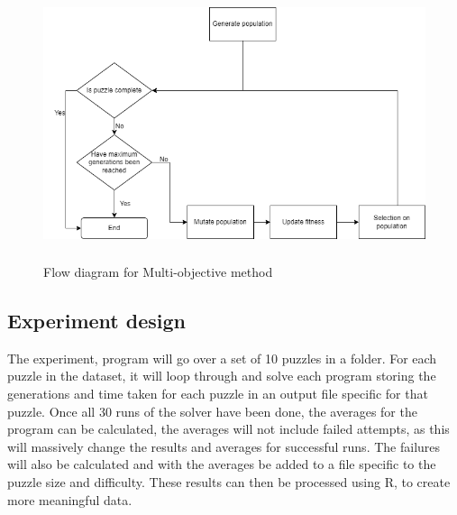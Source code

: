 \documentclass[a4paper,11pt]{article}
\begin{document}
\begin{figure}[h]
	\caption{Flow diagram for Multi-objective method}
	\centering
	\includegraphics[height=8cm,width=15cm]{./Diagrams/multiobjectiveFlowchart}
\end{figure}

\subsection{Experiment design}

The experiment, program will go over a set of 10 puzzles in a folder. For each puzzle in the dataset, it will loop through and solve each program storing the generations and time taken for each puzzle in an output file specific for that puzzle. Once all 30 runs of the solver have been done, the averages for the program can be calculated, the averages will not include failed attempts, as this will massively change the results and averages for successful runs. The failures will also be calculated and with the averages be added to a file specific to the puzzle size and difficulty. These results can then be processed using R, to create more meaningful data.
\end{document}

